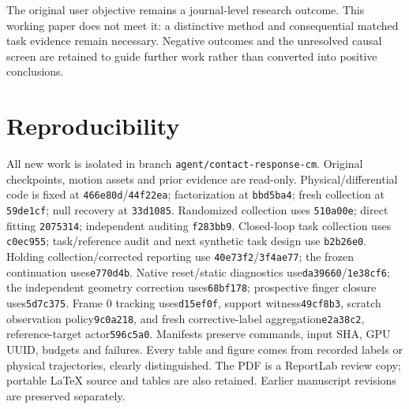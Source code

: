 \documentclass[10 pt]{article}
\begin{document}
The original user objective remains a journal-level research outcome. This working
paper does not meet it: a distinctive method and consequential matched task evidence
remain necessary. Negative outcomes and the unresolved causal screen are retained
to guide further work rather than converted into positive conclusions.

\section*{Reproducibility}
All new work is isolated in branch \texttt{agent/contact-response-cm}. Original
checkpoints, motion assets and prior evidence are read-only. Physical/differential
code is fixed at \texttt{466e80d}/\texttt{44f22ea}; factorization at
\texttt{bbd5ba4}; fresh collection at \texttt{59de1cf}; null recovery at
\texttt{33d1085}. Randomized collection uses \texttt{510a00e}; direct fitting
\texttt{2075314}; independent auditing \texttt{f283bb9}. Closed-loop task
collection uses \texttt{c0ec955}; task/reference audit and next synthetic task
design use \texttt{b2b26e0}. Holding collection/corrected reporting use
\texttt{40e73f2}/\texttt{3f4ae77}; the frozen continuation uses\texttt{e770d4b}.
Native reset/static diagnostics use\texttt{da39660}/\texttt{1e38cf6}; the independent
geometry correction uses\texttt{68bf178}; prospective finger closure uses\texttt{5d7c375}. Frame 0 tracking uses\texttt{d15ef0f},
support witness\texttt{49cf8b3}, scratch observation policy\texttt{9c0a218}, and
fresh corrective-label aggregation\texttt{e2a38c2}, reference-target actor\texttt{596c5a0}.
Manifests preserve commands, input SHA, GPU UUID,
budgets and failures. Every table and figure comes from recorded labels or physical trajectories, clearly distinguished.
The PDF is a ReportLab review copy; portable LaTeX source and tables are also
retained. Earlier manuscript revisions are preserved separately.
\end{document}
